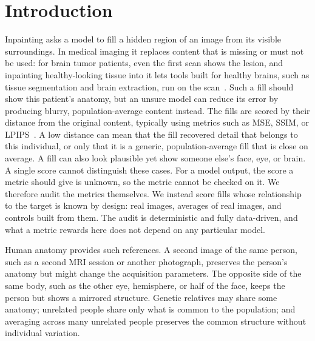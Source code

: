 \section{Introduction}
\label{sec:intro}
Inpainting asks a model to fill a hidden region of an image from its visible surroundings.
In medical imaging it replaces content that is missing or must not be used: for brain tumor patients, even the first scan shows the lesion, and inpainting healthy-looking tissue into it lets tools built for healthy brains, such as tissue segmentation and brain extraction, run on the scan~\cite{brats2023}.
Such a fill should show this patient's anatomy, but an unsure model can reduce its error by producing blurry, population-average content instead.
The fills are scored by their distance from the original content, typically using metrics such as \ac{MSE}, \ac{SSIM}, or \ac{LPIPS}~\cite{zhang2018lpips}.
A low distance can mean that the fill recovered detail that belongs to this individual, or only that it is a generic, population-average fill that is close on average.
A fill can also look plausible yet show someone else's face, eye, or brain.
A single score cannot distinguish these cases.
For a model output, the score a metric should give is unknown, so the metric cannot be checked on it.
We therefore audit the metrics themselves.
We instead score fills whose relationship to the target is known by design: real images, averages of real images, and controls built from them.
The audit is deterministic and fully data-driven, and what a metric rewards here does not depend on any particular model.

Human anatomy provides such references.
A second image of the same person, such as a second \ac{MRI} session or another photograph, preserves the person's anatomy but might change the acquisition parameters.
The opposite side of the same body, such as the other eye, hemisphere, or half of the face, keeps the person but shows a mirrored structure.
Genetic relatives may share some anatomy; unrelated people share only what is common to the population; and averaging across many unrelated people preserves the common structure without individual variation.

